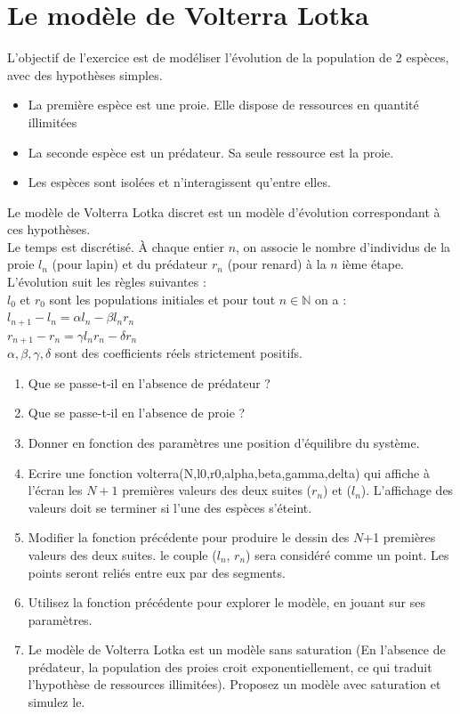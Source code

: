 \documentclass[a4paper,11pt]{book}
\newcommand{\N}{{\mathbb{N}}}
\begin{document}
\section{Le modèle de Volterra Lotka}
L’objectif de l’exercice est de mod\'eliser l’\'evolution de la population de 2
 esp\`eces, avec des hypoth\`eses simples.
\begin{itemize}
\item  La premi\`ere esp\`ece est une proie. Elle dispose de ressources en 
quantit\'e illimit\'ees
\item  La seconde esp\`ece est un pr\'edateur. Sa seule ressource est la proie.
\item  Les esp\`eces sont isol\'ees et n’interagissent qu’entre elles.
\end{itemize}
Le mod\`ele de Volterra Lotka discret est un mod\`ele d’\'evolution 
correspondant \`a ces hypoth\`eses. \\
Le temps est discr\'etis\'e. \`A chaque entier $n$, on associe le nombre 
d’individus de la proie $l_n$ (pour lapin) et du pr\'edateur $r_n$ (pour renard)
\`a la $n$ i\`eme \'etape. L’\'evolution suit les r\`egles suivantes :\\
$l_0$ et $r_0$ sont les populations initiales et pour tout $n \in \N$ on a  :\\
$l_{n+1}- l_n = \alpha l_n - \beta l_n r_n$\\
$r_{n+1} - r_{ n} = \gamma l_{ n} r_{ n} - \delta r_{ n}$\\
$\alpha, \beta, \gamma,  \delta$  sont des coefficients r\'eels strictement 
positifs.
\begin{enumerate}
\item  Que se passe-t-il en l’absence de pr\'edateur ?
\item  Que se passe-t-il en l’absence de proie ?
\item  Donner en fonction des param\`etres une position d’\'equilibre du 
syst\`eme.
\item  Ecrire une fonction volterra(N,l0,r0,alpha,beta,gamma,delta) qui affiche à l’\'ecran les $N+1$ 
premi\`eres valeurs des deux suites ($r_n$) et ($l_n$). L’affichage des valeurs doit se terminer si l’une des 
esp\`eces s’\'eteint.
\item  Modifier la fonction pr\'ec\'edente pour produire le dessin des $N$+1 premi\`eres 
valeurs des deux suites. 
le couple ($l_n$, $r_n$) sera consid\'er\'e comme un point. Les points seront reli\'es entre 
eux par des segments.
\item  Utilisez la fonction pr\'ec\'edente pour explorer le mod\`ele, en jouant sur ses 
param\`etres.
\item  Le mod\`ele de Volterra Lotka est un mod\`ele sans saturation (En l’absence de 
pr\'edateur, la population des proies croit exponentiellement, ce qui traduit l’hypoth\`ese 
de ressources illimit\'ees). 
Proposez un mod\`ele avec saturation et simulez le.
\end{enumerate}
\end{document}
